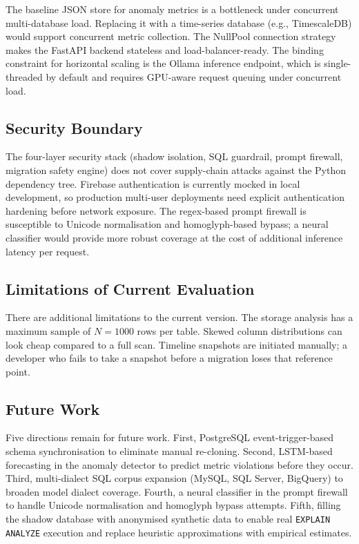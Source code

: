 \documentclass[conference]{IEEEtran}
\begin{document}
The baseline JSON store for anomaly metrics is a bottleneck under
concurrent multi-database load. Replacing it with a time-series database
(e.g., TimescaleDB) would support concurrent metric collection. The
NullPool connection strategy makes the FastAPI backend stateless and
load-balancer-ready. The binding constraint for horizontal scaling is the
Ollama inference endpoint, which is single-threaded by default and
requires GPU-aware request queuing under concurrent load.

\subsection{Security Boundary}

The four-layer security stack (shadow isolation, SQL guardrail, prompt
firewall, migration safety engine) does not cover supply-chain attacks
against the Python dependency tree. Firebase authentication is currently
mocked in local development, so production multi-user deployments need
explicit authentication hardening before network exposure. The
regex-based prompt firewall is susceptible to Unicode normalisation and
homoglyph-based bypass; a neural classifier would provide more robust
coverage at the cost of additional inference latency per request.

\subsection{Limitations of Current Evaluation}

There are additional limitations to the current version. The storage
analysis has a maximum sample of $N = 1000$ rows per table. Skewed
column distributions can look cheap compared to a full scan. Timeline
snapshots are initiated manually; a developer who fails to take a snapshot
before a migration loses that reference point.

\subsection{Future Work}

Five directions remain for future work. First, PostgreSQL event-trigger-based
schema synchronisation to eliminate manual re-cloning. Second, LSTM-based
forecasting in the anomaly detector to predict metric violations before
they occur. Third, multi-dialect SQL corpus expansion (MySQL, SQL Server,
BigQuery) to broaden model dialect coverage. Fourth, a neural classifier
in the prompt firewall to handle Unicode normalisation and homoglyph
bypass attempts. Fifth, filling the shadow database with anonymised
synthetic data to enable real \texttt{EXPLAIN ANALYZE} execution and
replace heuristic approximations with empirical estimates.
\end{document}
